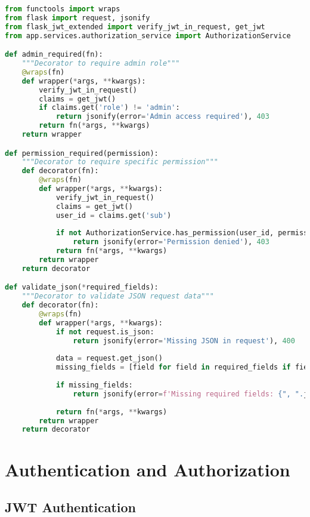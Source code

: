 \documentclass{article}
\begin{document}
\begin{lstlisting}[language=python, caption=Decorators in app/utils/decorators.py]
from functools import wraps
from flask import request, jsonify
from flask_jwt_extended import verify_jwt_in_request, get_jwt
from app.services.authorization_service import AuthorizationService

def admin_required(fn):
    """Decorator to require admin role"""
    @wraps(fn)
    def wrapper(*args, **kwargs):
        verify_jwt_in_request()
        claims = get_jwt()
        if claims.get('role') != 'admin':
            return jsonify(error='Admin access required'), 403
        return fn(*args, **kwargs)
    return wrapper

def permission_required(permission):
    """Decorator to require specific permission"""
    def decorator(fn):
        @wraps(fn)
        def wrapper(*args, **kwargs):
            verify_jwt_in_request()
            claims = get_jwt()
            user_id = claims.get('sub')
            
            if not AuthorizationService.has_permission(user_id, permission):
                return jsonify(error='Permission denied'), 403
            return fn(*args, **kwargs)
        return wrapper
    return decorator

def validate_json(*required_fields):
    """Decorator to validate JSON request data"""
    def decorator(fn):
        @wraps(fn)
        def wrapper(*args, **kwargs):
            if not request.is_json:
                return jsonify(error='Missing JSON in request'), 400
            
            data = request.get_json()
            missing_fields = [field for field in required_fields if field not in data]
            
            if missing_fields:
                return jsonify(error=f'Missing required fields: {", ".join(missing_fields)}'), 400
            
            return fn(*args, **kwargs)
        return wrapper
    return decorator
\end{lstlisting}

\section{Authentication and Authorization}

\subsection{JWT Authentication}
\end{document}
